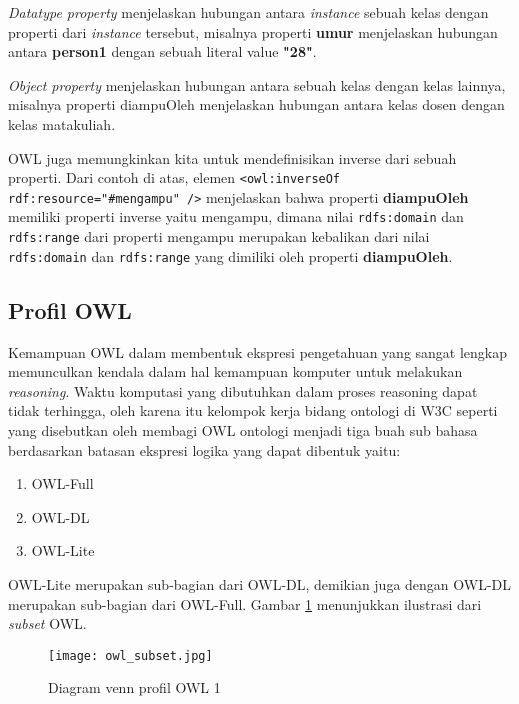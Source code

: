 \emph{Datatype property} menjelaskan hubungan antara \textit{instance} sebuah kelas dengan properti dari \textit{instance} tersebut, misalnya properti \textbf{umur} menjelaskan hubungan antara \textbf{person1} dengan sebuah literal value \textbf{"28"}. 


\emph{Object property} menjelaskan hubungan antara sebuah kelas dengan kelas lainnya, misalnya properti diampuOleh menjelaskan hubungan antara kelas dosen dengan kelas matakuliah. 


OWL juga memungkinkan kita untuk mendefinisikan inverse dari sebuah properti. Dari contoh di atas, elemen \texttt{<owl:inverseOf rdf:resource="\#mengampu" />} menjelaskan bahwa properti \textbf{diampuOleh} memiliki properti inverse yaitu mengampu, dimana nilai \texttt{rdfs:domain} dan \texttt{rdfs:range} dari properti mengampu merupakan kebalikan dari nilai \texttt{rdfs:domain} dan \texttt{rdfs:range} yang dimiliki oleh properti \textbf{diampuOleh}.

\subsection{Profil OWL}
Kemampuan OWL dalam membentuk ekspresi pengetahuan yang sangat lengkap memunculkan kendala dalam hal kemampuan komputer untuk melakukan \emph{reasoning}. Waktu komputasi yang dibutuhkan dalam proses reasoning dapat tidak terhingga, oleh karena itu kelompok kerja bidang ontologi di W3C seperti yang disebutkan oleh \citet*{mcguinness_vanharmelen} membagi OWL ontologi menjadi tiga buah sub bahasa berdasarkan batasan ekspresi logika yang dapat dibentuk yaitu:
\begin{enumerate}
	\item OWL-Full
	\item OWL-DL
	\item OWL-Lite
\end{enumerate}
OWL-Lite merupakan sub-bagian dari OWL-DL, demikian juga dengan OWL-DL merupakan sub-bagian dari OWL-Full. Gambar \ref{fig:owl_subset} menunjukkan ilustrasi dari \emph{subset} OWL.

\begin{figure}[ht]
	\centering
	\texttt{[image: owl\_subset.jpg]}
	\caption{Diagram venn profil OWL 1}
	\label{fig:owl_subset}
\end{figure}
